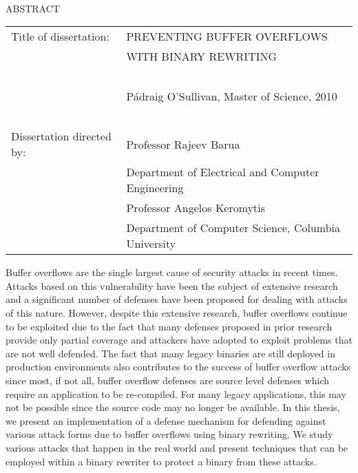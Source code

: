 
\hbox{\ }

\renewcommand{\baselinestretch}{1}
\small \normalsize

\begin{center}
\large{{ABSTRACT}} 

\vspace{3em} 

\end{center}
\hspace{-.15in}
\begin{tabular}{ll}
Title of dissertation:    & {\large  PREVENTING BUFFER OVERFLOWS}\\
&				      {\large  WITH BINARY REWRITING} \\
\ \\
&                          {\large  P\'{a}draig O'Sullivan, Master of Science, 2010} \\
\ \\
Dissertation directed by: & {\large  Professor Rajeev Barua} \\
&  				{\large	 Department of Electrical and Computer Engineering} \\
&  				{\large	 Professor Angelos Keromytis} \\
&  				{\large	 Department of Computer Science, Columbia University} \\
\end{tabular}

\vspace{3em}

\renewcommand{\baselinestretch}{2}
\large \normalsize

Buffer overflows are the single largest cause of security attacks in recent times. Attacks based on
this vulnerability have been the subject of extensive research and a significant number of defenses
have been proposed for dealing with attacks of this nature. However, despite this extensive
research, buffer overflows continue to be exploited due to the fact that many defenses proposed in
prior research provide only partial coverage and attackers have adopted to exploit problems that are
not well defended. The fact that many legacy binaries are still deployed in production environments
also contributes to the success of buffer overflow attacks since most, if not all, buffer overflow
defenses are source level defenses which require an application to be re-compiled. For many legacy
applications, this may not be possible since the source code may no longer be available. In this
thesis, we present an implementation of a defense mechanism for defending against various attack
forms due to buffer overflows using binary rewriting. We study various attacks that happen in the
real world and present techniques that can be employed within a binary rewriter to protect a binary
from these attacks.

